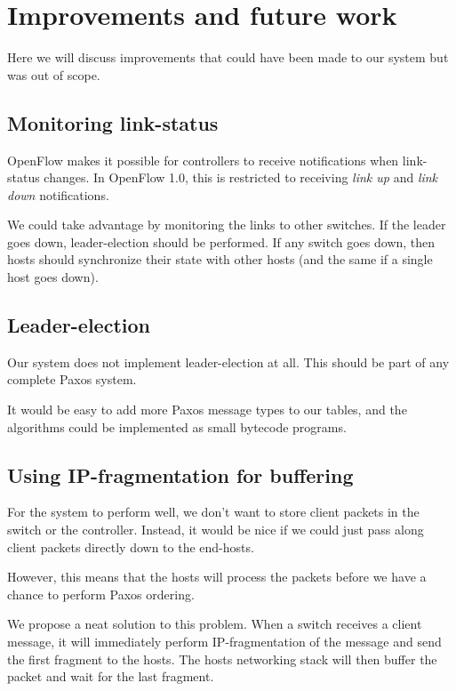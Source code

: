 \chapter{Improvements and future work}

Here we will discuss improvements that could have been made to our system
but was out of scope.

\section{Monitoring link-status}

OpenFlow makes it possible for controllers to receive notifications when
link-status changes.  In OpenFlow 1.0, this is restricted
to receiving \textit{link up} and \textit{link down}
notifications.

We could take advantage by monitoring the links to other switches.
If the leader goes down, leader-election should be performed.
If any switch goes down, then hosts should synchronize their state with
other hosts (and the same if a single host goes down).

\section{Leader-election}

Our system does not implement
leader-election at all.
This should be part of any complete Paxos system.

It would be easy to add more Paxos message types to our tables, and the
algorithms could be implemented as small bytecode programs.

\section{Using IP-fragmentation for buffering}

For the system to perform well, we don't want to store client packets in the
switch or the controller.  Instead, it would be nice if we could just pass
along client packets directly down to the end-hosts.

However, this means that the hosts will process the packets before we have a
chance to perform Paxos ordering.

We propose a neat solution to this problem.  When a switch receives a client
message, it will immediately perform IP-fragmentation of the message and
send the first fragment to the hosts.  The hosts networking stack will then
buffer the packet and wait for the last fragment.

